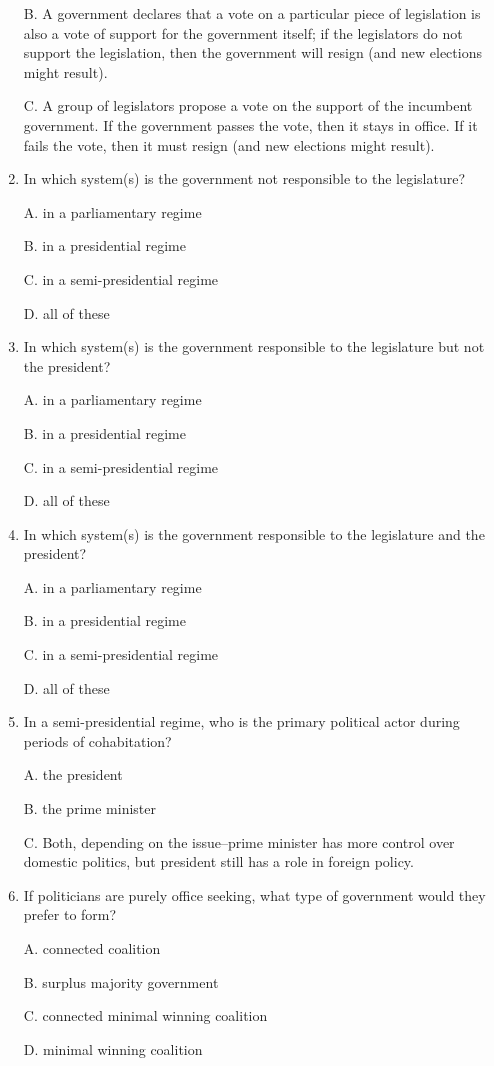 \documentclass[
]{book}
\begin{document}
\begin{enumerate}
  B. A government declares that a vote on a particular piece of legislation is also a vote of support for the government itself; if the legislators do not support the legislation, then the government will resign (and new elections might result).

  C. A group of legislators propose a vote on the support of the incumbent government. If the government passes the vote, then it stays in office. If it fails the vote, then it must resign (and new elections might result).
\item
  In which system(s) is the government not responsible to the legislature?

  A. in a parliamentary regime

  B. in a presidential regime

  C. in a semi-presidential regime

  D. all of these
\item
  In which system(s) is the government responsible to the legislature but not the president?

  A. in a parliamentary regime

  B. in a presidential regime

  C. in a semi-presidential regime

  D. all of these
\item
  In which system(s) is the government responsible to the legislature and the president?

  A. in a parliamentary regime

  B. in a presidential regime

  C. in a semi-presidential regime

  D. all of these
\item
  In a semi-presidential regime, who is the primary political actor during periods of cohabitation?

  A. the president

  B. the prime minister

  C. Both, depending on the issue--prime minister has more control over domestic politics, but president still has a role in foreign policy.
\item
  If politicians are purely office seeking, what type of government would they prefer to form?

  A. connected coalition

  B. surplus majority government

  C. connected minimal winning coalition

  D. minimal winning coalition


\end{enumerate}
\end{document}
